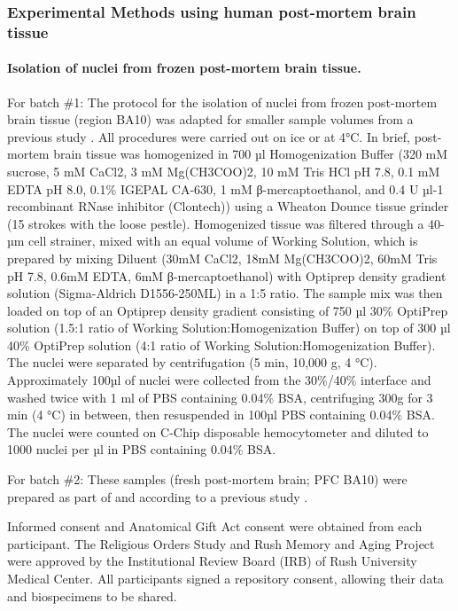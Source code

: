 \subsubsection{Experimental Methods using human post-mortem brain tissue}

\paragraph{Isolation of nuclei from frozen post-mortem brain tissue.}
For batch \#1: The protocol for the isolation of nuclei from frozen post-mortem brain tissue (region BA10) was adapted for smaller sample volumes from a previous study \cite{Mathys2019-wb}. All procedures were carried out on ice or at 4°C. In brief, post-mortem brain tissue was homogenized in 700 µl Homogenization Buffer (320 mM sucrose, 5 mM CaCl2, 3 mM Mg(CH3COO)2, 10 mM Tris HCl pH 7.8, 0.1 mM EDTA pH 8.0, 0.1\% IGEPAL CA-630, 1 mM β-mercaptoethanol, and 0.4 U µl-1 recombinant RNase inhibitor (Clontech)) using a Wheaton Dounce tissue grinder (15 strokes with the loose pestle). Homogenized tissue was filtered through a 40-µm cell strainer, mixed with an equal volume of Working Solution, which is prepared by mixing Diluent (30mM CaCl2, 18mM Mg(CH3COO)2, 60mM Tris pH 7.8, 0.6mM EDTA, 6mM β-mercaptoethanol) with Optiprep density gradient solution (Sigma-Aldrich D1556-250ML) in a 1:5 ratio. The sample mix was then loaded on top of an Optiprep density gradient consisting of 750 µl 30\% OptiPrep solution (1.5:1 ratio of Working Solution:Homogenization Buffer) on top of 300 µl 40\% OptiPrep solution (4:1 ratio of Working Solution:Homogenization Buffer). The nuclei were separated by centrifugation (5 min, 10,000 g, 4 °C). Approximately 100µl of nuclei were collected from the 30\%/40\% interface and washed twice with 1 ml of PBS containing 0.04\% BSA, centrifuging 300g for 3 min (4 °C) in between, then resuspended in 100µl PBS containing 0.04\% BSA. The nuclei were counted on C-Chip disposable hemocytometer and diluted to 1000 nuclei per µl in PBS containing 0.04\% BSA. 

For batch \#2: These samples (fresh post-mortem brain; PFC BA10) were prepared as part of and according to a previous study \cite{Mathys2019-wb}.

Informed consent and Anatomical Gift Act consent were obtained from each participant. The Religious Orders Study and Rush Memory and Aging Project were approved by the Institutional Review Board (IRB) of Rush University Medical Center. All participants signed a repository consent, allowing their data and biospecimens to be shared.

